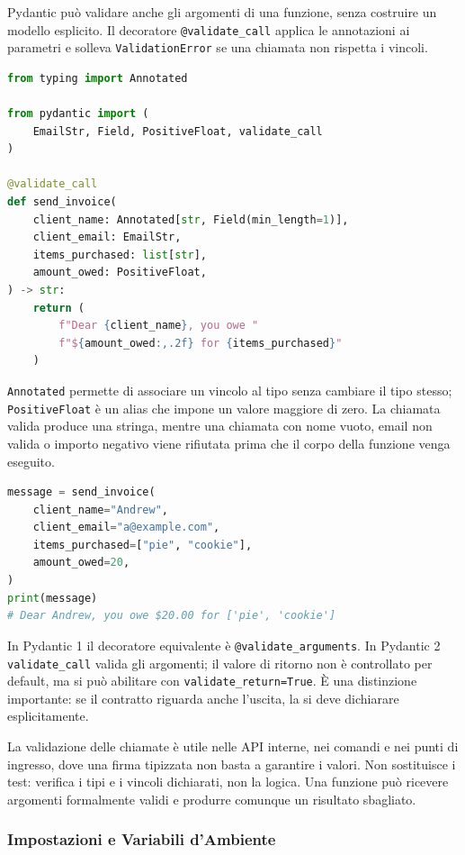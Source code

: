 \documentclass[12pt]{extarticle}
\begin{document}
\noindent Pydantic può validare anche gli argomenti di una funzione, senza costruire un modello esplicito. Il decoratore \texttt{@validate\_call} applica le annotazioni ai parametri e solleva \texttt{ValidationError} se una chiamata non rispetta i vincoli.

\begin{lstlisting}[language=Python]
from typing import Annotated

from pydantic import (
    EmailStr, Field, PositiveFloat, validate_call
)

@validate_call
def send_invoice(
    client_name: Annotated[str, Field(min_length=1)],
    client_email: EmailStr,
    items_purchased: list[str],
    amount_owed: PositiveFloat,
) -> str:
    return (
        f"Dear {client_name}, you owe "
        f"${amount_owed:,.2f} for {items_purchased}"
    )
\end{lstlisting}

\noindent \texttt{Annotated} permette di associare un vincolo al tipo senza cambiare il tipo stesso; \texttt{PositiveFloat} è un alias che impone un valore maggiore di zero. La chiamata valida produce una stringa, mentre una chiamata con nome vuoto, email non valida o importo negativo viene rifiutata prima che il corpo della funzione venga eseguito.

\begin{lstlisting}[language=Python]
message = send_invoice(
    client_name="Andrew",
    client_email="a@example.com",
    items_purchased=["pie", "cookie"],
    amount_owed=20,
)
print(message)
# Dear Andrew, you owe $20.00 for ['pie', 'cookie']
\end{lstlisting}

\noindent In Pydantic 1 il decoratore equivalente è \texttt{@validate\_arguments}. In Pydantic 2 \texttt{validate\_call} valida gli argomenti; il valore di ritorno non è controllato per default, ma si può abilitare con \texttt{validate\_return=True}. È una distinzione importante: se il contratto riguarda anche l'uscita, la si deve dichiarare esplicitamente.

\noindent La validazione delle chiamate è utile nelle API interne, nei comandi e nei punti di ingresso, dove una firma tipizzata non basta a garantire i valori. Non sostituisce i test: verifica i tipi e i vincoli dichiarati, non la logica. Una funzione può ricevere argomenti formalmente validi e produrre comunque un risultato sbagliato.

\subsubsection{Impostazioni e Variabili d'Ambiente}
\end{document}
